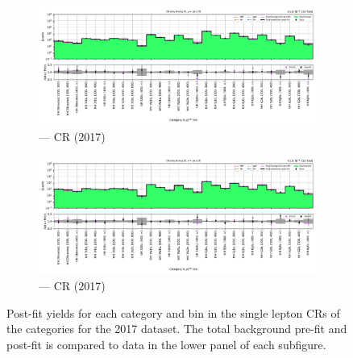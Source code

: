 \begin{figure}[htbp]
    \centering
    \begin{subfigure}[b]{0.9\textwidth}
        \includegraphics[width=\textwidth]{chapters/higgstoinv/figures/mountain_ranges/2017/ttH/Wmunu_tree_fit_b-abs_values_ttH_cats.pdf}
        \caption{\ttH --- \singleMuCr \gls{CR} (2017)}
    \end{subfigure}

    \begin{subfigure}[b]{0.9\textwidth}
        \includegraphics[width=\textwidth]{chapters/higgstoinv/figures/mountain_ranges/2017/ttH/Wenu_tree_fit_b-abs_values_ttH_cats.pdf}
        \caption{\ttH --- \singleEleCr \gls{CR} (2017)}
    \end{subfigure}
    \caption[Post-fit yields for each category and \ptmiss bin in the single lepton control regions of the \ttH categories for the 2017 dataset]{Post-fit yields for each category and \ptmiss bin in the single lepton \glspl{CR} of the \ttH categories for the 2017 dataset. The total background pre-fit and post-fit is compared to data in the lower panel of each subfigure.}
    \label{fig:htoinv_mountain_range_2017_single_lep_ttH}
\end{figure}

